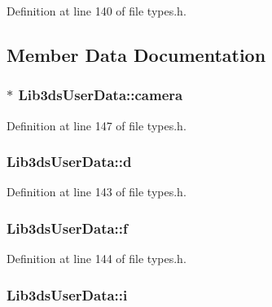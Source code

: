 Definition at line 140 of file types.\-h.



\subsection{Member Data Documentation}
\hypertarget{union_lib3ds_user_data_a13779b6ed8148079744074ca0380b119}{
\subsubsection[{camera}]{$\ast$ Lib3ds\-User\-Data\-::camera}}\label{union_lib3ds_user_data_a13779b6ed8148079744074ca0380b119}


Definition at line 147 of file types.\-h.

\hypertarget{union_lib3ds_user_data_a9125862ea8f73e1303c7726b8fff95e8}{
\subsubsection[{d}]{ Lib3ds\-User\-Data\-::d}}\label{union_lib3ds_user_data_a9125862ea8f73e1303c7726b8fff95e8}


Definition at line 143 of file types.\-h.

\hypertarget{union_lib3ds_user_data_af710dd2630267bfd3b1b7803f81f42e6}{
\subsubsection[{f}]{ Lib3ds\-User\-Data\-::f}}\label{union_lib3ds_user_data_af710dd2630267bfd3b1b7803f81f42e6}


Definition at line 144 of file types.\-h.

\hypertarget{union_lib3ds_user_data_a6be97246f4435beffdfcb90f86ebc16e}{
\subsubsection[{i}]{ Lib3ds\-User\-Data\-::i}}\label{union_lib3ds_user_data_a6be97246f4435beffdfcb90f86ebc16e}


